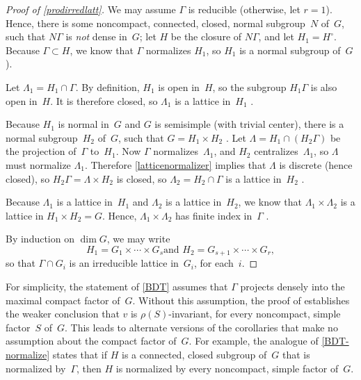  \begin{proof}[Proof of \cref{prodirredlatt}] \label{prodirredlattPf}
  We may assume $\Gamma$ is reducible (otherwise, let $r =
1$). Hence, there is some noncompact, connected, closed,
normal subgroup~$N$ of~$G$, such that $N \Gamma$ is
\emph{not} dense in~$G$; let $H$ be the closure of
$N\Gamma$, and let $H_1 = H^\circ$. Because $\Gamma \subset
H$, we know that $\Gamma$ normalizes $H_1$, so
$H_1$ is a normal subgroup of~$G$ ).

Let $\Lambda_1 = H_1 \cap \Gamma$. By
definition, $H_1$ is open in~$H$, so the subgroup $H_1 \Gamma$ is also
open in~$H$. It is therefore closed,
so $\Lambda_1$ is a lattice in~$H_1$
. 

Because $H_1$ is normal in~$G$ and $G$ is semisimple (with
trivial center), there is a normal subgroup~$H_2$ of~$G$,
such that $G = H_1 \times H_2$ . Let $\Lambda
= H_1 \cap (H_2 \Gamma)$ be the projection of~$\Gamma$
to~$H_1$. Now $\Gamma$ normalizes~$\Lambda_1$, and $H_2$
centralizes~$\Lambda_1$, so $\Lambda$ must normalize
$\Lambda_1$. Therefore \cref{latticenormalizer}
implies that $\Lambda$ is discrete (hence closed), so $H_2
\Gamma = \Lambda \times H_2$ is closed, so $\Lambda_2 = H_2
\cap \Gamma$ is a lattice in~$H_2$ .

Because $\Lambda_1$ is a lattice in~$H_1$ and $\Lambda_2$
is a lattice in~$H_2$, we know that $\Lambda_1 \times
\Lambda_2$ is a lattice in $H_1 \times H_2 = G$. Hence,
$\Lambda_1 \times \Lambda_2$ has finite index in~$\Gamma$
.

By induction on $\dim G$, we may write 
	$$ \text{$H_1 = G_1 \times \cdots \times G_s$
	 \ and \ 
	 $H_2 = G_{s+1} \times \cdots \times G_r$} 
	 , $$
so that $\Gamma \cap G_i$ is an irreducible lattice
in~$G_i$, for each~$i$.
 \end{proof}

\begin{rem} \label{BDTNotProj}
For simplicity, the statement of \cref{BDT} assumes that $\Gamma$ projects densely into the maximal compact factor of~$G$. Without this assumption, the proof of  establishes the weaker conclusion that $v$ is $\rho(S)$-invariant, for every noncompact, simple factor~$S$ of~$G$. This leads to alternate versions of the corollaries that make no assumption about the compact factor of~$G$. For example, the analogue of \cref{BDT-normalize} states that 
if $H$ is a connected, closed subgroup of~$G$ that is
normalized by~$\Gamma$, then $H$ is normalized by every noncompact, simple factor of~$G$.
\end{rem}

